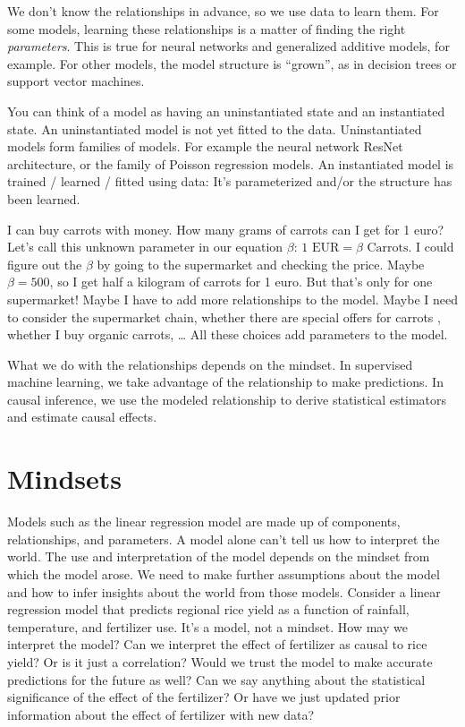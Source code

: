 \documentclass[
  10pt,
]{scrbook}
\begin{document}
We don't know the relationships in advance, so we use data to learn them.
For some models, learning these relationships is a matter of finding the right \emph{parameters}.
This is true for neural networks and generalized additive models, for example.
For other models, the model structure is ``grown'', as in decision trees or support vector machines.

You can think of a model as having an uninstantiated state and an instantiated state.
An uninstantiated model is not yet fitted to the data.
Uninstantiated models form families of models.
For example the neural network ResNet architecture, or the family of Poisson regression models.
An instantiated model is trained / learned / fitted using data: It's parameterized and/or the structure has been learned.

I can buy carrots with money.
How many grams of carrots can I get for 1 euro?
Let's call this unknown parameter in our equation \(\beta\):
\(1 \text{ EUR} = \beta \text{ Carrots}\).
I could figure out the \(\beta\) by going to the supermarket and checking the price.
Maybe \(\beta = 500\), so I get half a kilogram of carrots for 1 euro.
But that's only for one supermarket!
Maybe I have to add more relationships to the model.
Maybe I need to consider the supermarket chain, whether there are special offers for carrots , whether I buy organic carrots, \ldots{}
All these choices add parameters to the model.

What we do with the relationships depends on the mindset.
In supervised machine learning, we take advantage of the relationship to make predictions.
In causal inference, we use the modeled relationship to derive statistical estimators and estimate causal effects.

\hypertarget{mindsets}{%
\chapter{Mindsets}\label{mindsets}}

Models such as the linear regression model are made up of components, relationships, and parameters.
A model alone can't tell us how to interpret the world.
The use and interpretation of the model depends on the mindset from which the model arose.
We need to make further assumptions about the model and how to infer insights about the world from those models.
Consider a linear regression model that predicts regional rice yield as a function of rainfall, temperature, and fertilizer use.
It's a model, not a mindset.
How may we interpret the model?
Can we interpret the effect of fertilizer as causal to rice yield? Or is it just a correlation?
Would we trust the model to make accurate predictions for the future as well?
Can we say anything about the statistical significance of the effect of the fertilizer?
Or have we just updated prior information about the effect of fertilizer with new data?
\end{document}
